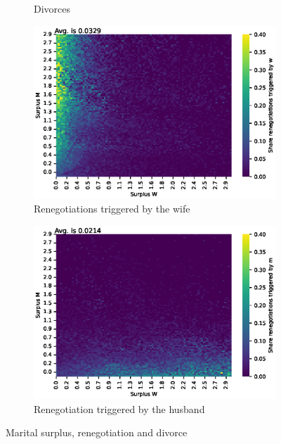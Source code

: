 \documentclass[]{article}
\begin{document}
\begin{figure}[H]
\begin{subfigure}{0.49\textwidth}
		\caption{Divorces}
		\label{fig:picture2}
	\end{subfigure}
	\begin{subfigure}{0.49\textwidth}
		\centering
		\includegraphics[width=\textwidth]{surp_renw.eps} %
		\caption{Renegotiations triggered by the wife}
		\label{fig:picture3}
	\end{subfigure}
	\begin{subfigure}{0.49\textwidth}
		\centering
		\includegraphics[width=\textwidth]{surp_renm.eps} %
		\caption{Renegotiation triggered by the husband}
		\label{fig:picture3}
	\end{subfigure}
	
	\caption{Marital surplus, renegotiation and divorce}
	\label{fig:surp_ren}
\end{figure}
\end{document}
